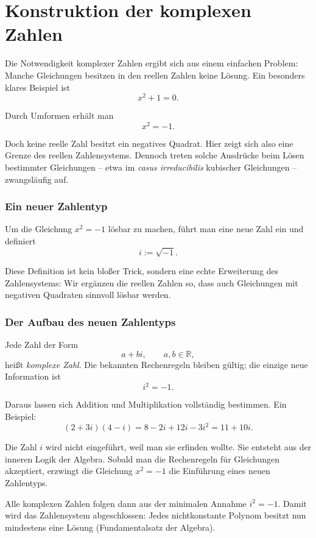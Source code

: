 \section{Konstruktion der komplexen Zahlen}
\label{anhangA_komplexe}

Die Notwendigkeit komplexer Zahlen ergibt sich aus einem einfachen
Problem: Manche Gleichungen besitzen in den reellen Zahlen keine Lösung.
Ein besonders klares Beispiel ist
\[
x^2 + 1 = 0.
\]

Durch Umformen erhält man
\[
x^2 = -1.
\]

Doch keine reelle Zahl besitzt ein negatives Quadrat.
Hier zeigt sich also eine Grenze des reellen Zahlensystems.
Dennoch treten solche Ausdrücke
beim Lösen bestimmter Gleichungen -- etwa im \emph{casus irreducibilis}
kubischer Gleichungen -- zwangsläufig auf.

\subsubsection*{Ein neuer Zahlentyp}

Um die Gleichung $x^2 = -1$ lösbar zu machen, führt man eine neue Zahl
ein und definiert
\[
i := \sqrt{-1}.
\]

Diese Definition ist kein bloßer Trick, sondern eine echte Erweiterung
des Zahlensystems: Wir ergänzen die reellen Zahlen so, dass auch Gleichungen
mit negativen Quadraten sinnvoll lösbar werden.

\subsubsection*{Der Aufbau des neuen Zahlentyps}

Jede Zahl der Form
\[
a + bi, \qquad a,b \in \mathbb{R},
\]
heißt \emph{komplexe Zahl}. Die bekannten Rechenregeln bleiben gültig;
die einzige neue Information ist
\[
i^2 = -1.
\]

Daraus lassen sich Addition und Multiplikation vollständig bestimmen.
Ein Beispiel:
\[
(2 + 3i)(4 - i)
= 8 - 2i + 12i - 3i^2
= 11 + 10i.
\]

\begin{DidacticBox}
	\label{box:i-notwendig}
	Die Zahl $i$ wird nicht eingeführt, weil man sie \glqq erfinden\grqq{} wollte.
	Sie entsteht aus der inneren Logik der Algebra.
	Sobald man die Rechenregeln für Gleichungen akzeptiert,
	erzwingt die Gleichung
	$x^2 = -1$
	die Einführung eines neuen Zahlentyps.
	
	Alle komplexen Zahlen folgen dann aus der minimalen Annahme
	$i^2 = -1$.
	Damit wird das Zahlensystem abgeschlossen:
	Jedes nichtkonstante Polynom besitzt nun mindestens eine Lösung
	(Fundamentalsatz der Algebra).
\end{DidacticBox}

